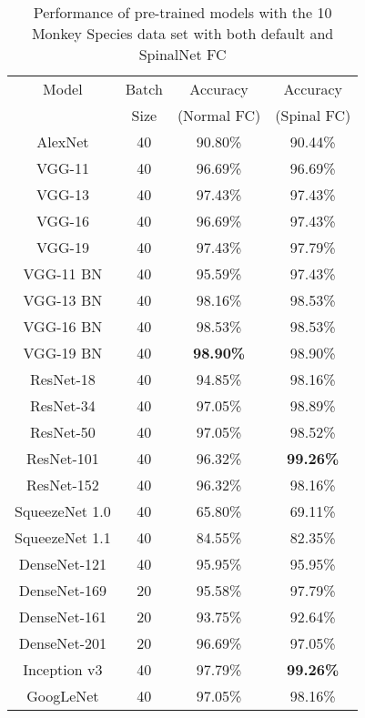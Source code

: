 \documentclass[conference]{IEEEtran}
\begin{document}
\begin{table}
		\caption{Performance of pre-trained models with the 10 Monkey Species data set with both default and SpinalNet FC}
		\label{Monkey_Results} \centering
\begin{tabular}{|c|c|c|c|}	\hline 

    Model & Batch   & Accuracy    & Accuracy    \\ 
          & Size     & (Normal FC) & (Spinal FC) \\
    
    \hline AlexNet & 40 &   90.80\%    & 90.44\% \\
    \hline VGG-11  & 40 &   96.69\%    & 96.69\%   \\ 
    \hline VGG-13  & 40 &   97.43\%    & 97.43\%   \\
    \hline VGG-16  & 40 &   96.69\%    & 97.43\%   \\
    \hline VGG-19  & 40 &   97.43\%    & 97.79\%   \\
    \hline VGG-11 BN    & 40 & 95.59\% & 97.43\%   \\
    \hline VGG-13 BN    & 40 & 98.16\% & 98.53\% \\
    \hline VGG-16 BN    & 40 & 98.53\% & 98.53\% \\
    \hline VGG-19 BN    & 40 & \textbf{98.90\%} & 98.90\% \\
    \hline ResNet-18    & 40 & 94.85\%  & 98.16\% \\
    \hline ResNet-34    & 40 & 97.05\%  & 98.89\% \\
    \hline ResNet-50    & 40 & 97.05\%  & 98.52\% \\
    \hline ResNet-101   & 40 & 96.32\%  & \textbf{99.26\%} \\
    \hline ResNet-152   & 40 & 96.32\%  & 98.16\% \\
    \hline SqueezeNet 1.0 & 40 & 65.80\% & 69.11\% \\
    \hline SqueezeNet 1.1 & 40 & 84.55\% & 82.35\% \\
    \hline DenseNet-121 & 40 & 95.95\%  & 95.95\% \\
    \hline DenseNet-169 & 20 & 95.58\%  & 97.79\% \\
    \hline DenseNet-161 & 20 & 93.75\%  & 92.64\% \\
    \hline DenseNet-201 & 20 & 96.69\%  & 97.05\% \\
    \hline Inception v3 & 40 & 97.79\%  & \textbf{99.26\%} \\
    \hline GoogLeNet    & 40 & 97.05\%  & 98.16\% \\

\end{tabular}
\end{table}
\end{document}
